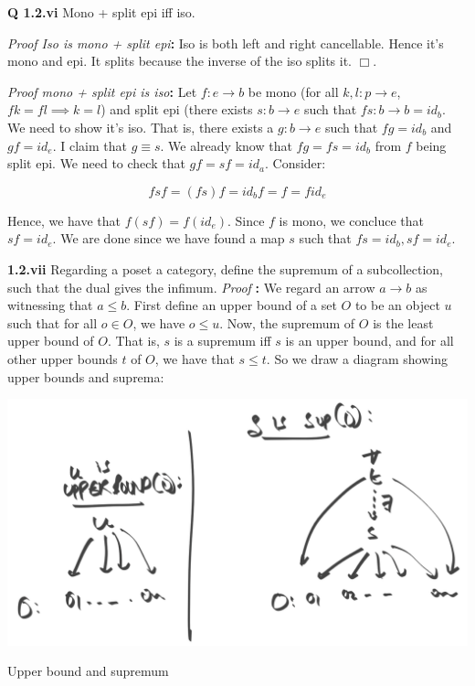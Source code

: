 \documentclass[11pt]{book}
\def\qed{$\Box$}
\newcommand{\beginproof}[1][]{\emph{Proof #1}\textbf{:} }
\newcommand{\question}[1]{\textbf{#1}}
\begin{document}
\question{Q 1.2.vi} Mono + split epi iff iso.


\beginproof[Iso is mono + split epi]
Iso is both left and right cancellable. Hence it's mono and epi. It splits because the inverse of the iso splits it. \qed.


\beginproof[mono + split epi is iso]
Let $f: e \rightarrow b$ be mono (for all $k, l: p \to e$, $fk = fl \implies k = l$)
and split epi (there exists $s: b \rightarrow e$ such that $fs: b \rightarrow b = id_b$.
We need to show it's iso. That is, there exists a $g: b \rightarrow e$ such that $fg = id_b$ and $gf = id_e$.
I claim that $g \equiv s$. We already know that $fg = fs = id_b$ from $f$ being split epi. We need to 
check that $gf = sf = id_a$. Consider:

$$fsf = (fs)f = id_b f = f = f id_e$$

Hence, we have that $f(sf) = f(id_e)$. Since $f$ is mono, we concluce that $sf = id_e$. We are done 
since we have found a map $s$ such that $fs = id_b, sf = id_e$.


\question{1.2.vii} Regarding a poset a category, define the supremum of a subcollection, such that the dual gives the infimum.
\beginproof We regard an arrow $a \to b$ as witnessing that $a \leq b$. First define an upper bound of a set $O$
to be an object $u$ such that for all $o \in O$, we have $o \leq u$. Now, the supremum of $O$ is the least upper bound
of $O$. That is, $s$ is a supremum iff $s$ is an upper bound, and for all other upper bounds $t$ of $O$, we have that $s \leq t$.
So we draw a diagram showing upper bounds and suprema:

\begin{minipage}{\textwidth}
\includegraphics[width=\textwidth]{ch1/sup.png}
    \begin{center}Upper bound and supremum\end{center}
\end{minipage}
\end{document}
